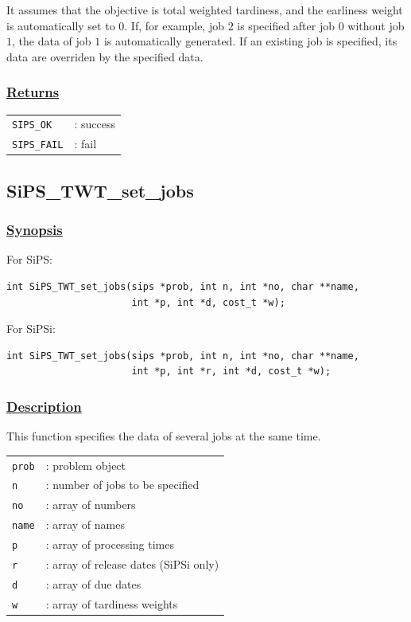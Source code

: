 \documentclass[a4paper]{book}
\begin{document}
\noindent
It assumes that the objective is total weighted tardiness, and the earliness weight is automatically set to 0.
If, for example, job $2$ is specified after job $0$ without job $1$, the data of job $1$ is automatically generated.
If an existing job is specified, its data are overriden by the specified data.

\subsubsection{\underline{Returns}}

\begin{tabular}{ll}
  \verb+SIPS_OK+  &: success\\
  \verb+SIPS_FAIL+&: fail\\
\end{tabular}

\hypertarget{SiPS_TWT_set_jobs}{%
\subsection{SiPS\_TWT\_set\_jobs}
}

\subsubsection{\underline{Synopsis}}

For SiPS:

\begin{verbatim}
int SiPS_TWT_set_jobs(sips *prob, int n, int *no, char **name,
                      int *p, int *d, cost_t *w);
\end{verbatim}

\noindent
For SiPSi:

\begin{verbatim}
int SiPS_TWT_set_jobs(sips *prob, int n, int *no, char **name,
                      int *p, int *r, int *d, cost_t *w);
\end{verbatim}

\subsubsection{\underline{Description}}

This function specifies the data of several jobs at the same time.

\begin{tabular}{ll}
  \verb+prob+ &: problem object\\
  \verb+n+    &: number of jobs to be specified\\
  \verb+no+   &: array of numbers\\
  \verb+name+ &: array of names\\
  \verb+p+    &: array of processing times\\
  \verb+r+    &: array of release dates (SiPSi only)\\
  \verb+d+    &: array of due dates\\
  \verb+w+    &: array of tardiness weights\\
\end{tabular}\\
\end{document}
